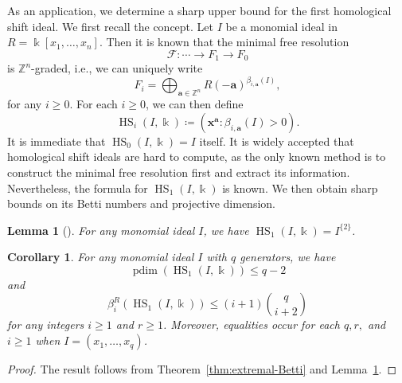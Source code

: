 \documentclass[reqno]{amsart}
\DeclareMathOperator{\pdim}{pdim}
\DeclareMathOperator{\HS}{HS}
\newtheorem{lemma}[theorem]{Lemma}
\newtheorem{corollary}[theorem]{Corollary}
\theoremstyle{definition}
\theoremstyle{remark}
\numberwithin{equation}{section}
\begin{document}

As an application, we determine a sharp upper bound for the first homological shift ideal. We first recall  the concept. Let $I$ be a monomial ideal in $R=\Bbbk[x_1,\dots, x_n]$. Then it is known that the minimal free resolution
\[
\mathcal{F}:\cdots \to F_1\to F_0
\]
is $\mathbb{Z}^n$-graded, i.e., we can  uniquely write
\[
F_i=\bigoplus_{\mathbf{a}\in \mathbb{Z}^n} R(-\mathbf{a})^{\beta_{i,\mathbf{a}}(I)},
\]
for any $i\geq 0$. For each $i\geq 0$, we can then define
\begin{equation}\label{def:shiftideals}
    \HS_i(I,\Bbbk)\coloneqq ( \mathbf{x}^{\mathbf{a}} \colon \beta_{i,\mathbf{a}}(I)>0 ).
\end{equation}
It is immediate that $\HS_0(I,\Bbbk)=I$ itself. It is widely accepted that homological shift ideals are hard to compute, as the only known method is to construct the minimal free resolution first and extract its information. Nevertheless, the formula for $\HS_1(I,\Bbbk)$ is known. We then obtain sharp bounds on its Betti numbers and projective dimension.

\begin{lemma}[]\label{lem:HS1}
    For any monomial ideal $I$, we have $\HS_1(I,\Bbbk)=I^{\{2\}}$.
\end{lemma}


\begin{corollary}
    For any monomial ideal $I$ with $q$ generators, we have
    \[
    \pdim(\HS_1(I,\Bbbk))\leq q-2
    \]
    and
    \[
    \beta_i^R(\HS_1(I,\Bbbk))\leq (i+1) \binom{q}{i+2}
    \]
    for any integers $i\geq 1$ and $r\geq 1$. Moreover, equalities occur for each $q,r,$ and $i\geq 1$ when $I=(x_1,\dots, x_q)$.
\end{corollary}
\begin{proof}
    The result follows from Theorem~\ref{thm:extremal-Betti} and Lemma~\ref{lem:HS1}. 
\end{proof}


\end{document}
